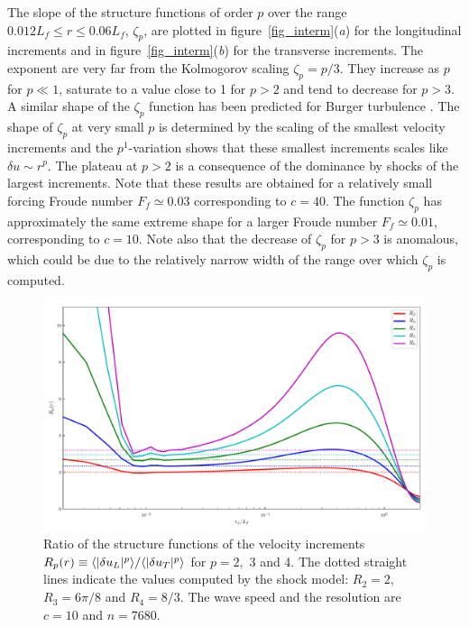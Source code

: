 The slope of the structure functions of order $p$ over the range
$0.012 L_f\leqslant r \leqslant 0.06 L_f$, $\zeta_p$, are plotted in
figure~\ref{fig_interm}(\textit{a}) for the longitudinal increments
and in figure~\ref{fig_interm}(\textit{b}) for the transverse
increments.
%
The exponent are very far from the Kolmogorov scaling $\zeta_p = p/3$.
They increase as $p$ for $p\ll1$, saturate to a value close to 1 for
$p>2$ and tend to decrease for $p>3$.
%
A similar shape of the $\zeta_p$ function has been predicted for
Burger turbulence \cite[]{BouchaudMezardParisi1995}.
%
The shape of $\zeta_p$ at very small $p$ is determined by the
scaling of the smallest velocity increments and the $p^1$-variation
shows that these smallest increments scales like $\delta u \sim r^p$.
%
The plateau at $p > 2$ is a consequence of the dominance by shocks of
the largest increments.
%
Note that these results are obtained for a relatively small forcing
Froude number $F_f \simeq 0.03$ corresponding to $c=40$.  The function
$\zeta_p$ has approximately the same extreme shape for a larger Froude
number $F_f \simeq 0.01$, corresponding to $c=10$.  Note also that the
decrease of $\zeta_p$ for $p>3$ is anomalous, which could be due to
the relatively narrow width of the range over which $\zeta_p$ is
computed.



\begin{figure}
\centerline{\includegraphics[width=\halfwidth]{../Pyfig/fig_ratio_strfct}}
\caption{
Ratio of the structure functions of the velocity increments
$R_p(r) \equiv \langle |\delta u_L|^p \rangle / \langle |\delta u_T|^p \rangle$
for $p = 2,$ 3 and 4.
The dotted straight lines indicate the values computed by the shock model:
$R_2 = 2$, $R_3 = 6\pi/8$ and $R_4 = 8/3$.
%
The wave speed and the resolution are $c = 10$ and $n = 7680$.  }
\label{fig_ratio}
\end{figure}


